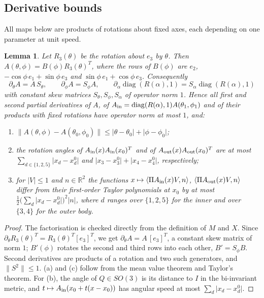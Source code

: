 \documentclass[11pt]{amsart}
\newtheorem{lemma}[theorem]{Lemma}
\theoremstyle{definition}
\newcommand{\R}{\mathbb{R}}
\newcommand{\Prj}{\Pi}
\newcommand{\ip}[2]{\langle #1,#2\rangle}
\newcommand{\abs}[1]{\lvert #1\rvert}
\newcommand{\norm}[1]{\lVert #1\rVert}
\begin{document}
\subsection{Derivative bounds}
All maps below are products of rotations about fixed axes, each depending on one parameter at unit speed.
\begin{lemma}\label{lem:deriv}
Let $R_3(\theta)$ be the rotation about $e_3$ by $\theta$. Then $A(\theta,\phi)=B(\phi)R_3(\theta)^T$, where the rows of
$B(\phi)$ are $e_2$, $-\cos\phi\,e_1+\sin\phi\,e_3$ and $\sin\phi\,e_1+\cos\phi\,e_3$. Consequently
\[
\partial_\theta A=A\,S_\theta,\qquad \partial_\phi A=S_\phi A,\qquad \partial_\alpha\operatorname{diag}(R(\alpha),1)=S_\alpha\operatorname{diag}(R(\alpha),1)
\]
with constant skew matrices $S_\theta,S_\phi,S_\alpha$ of operator norm $1$. Hence all first and second partial
derivatives of $A$, of $A_{\rm in}=\operatorname{diag}(R(\alpha),1)A(\theta_1,\phi_1)$ and of their products with fixed
rotations have operator norm at most $1$, and:
\begin{enumerate}[label=(\alph*)]
\item $\norm{A(\theta,\phi)-A(\theta_0,\phi_0)}\le\abs{\theta-\theta_0}+\abs{\phi-\phi_0}$;
\item the rotation angles of $A_{\rm in}(x)A_{\rm in}(x_0)^T$ and of $A_{\rm out}(x)A_{\rm out}(x_0)^T$ are at most
 $\sum_{d\in\{1,2,5\}}\abs{x_d-x_d^0}$ and $\abs{x_3-x_3^0}+\abs{x_4-x_4^0}$, respectively;
\item for $\abs V\le1$ and $n\in\R^2$ the functions $x\mapsto\ip{\Prj A_{\rm in}(x)V}{n}$, $\ip{\Prj A_{\rm out}(x)V}{n}$ differ
 from their first-order Taylor polynomials at $x_0$ by at most $\tfrac12\bigl(\sum_d\abs{x_d-x_d^0}\bigr)^2\abs n$, where
 $d$ ranges over $\{1,2,5\}$ for the inner and over $\{3,4\}$ for the outer body.
\end{enumerate}
\end{lemma}
\begin{proof}
The factorisation is checked directly from the definition of $M$ and $X$. Since
$\partial_\theta R_3(\theta)^T=R_3(\theta)^T[e_3]^T$, we get
$\partial_\theta A=A\,[e_3]^T$, a constant skew matrix of norm $1$; $B'(\phi)$ rotates the second and third rows
into each other, $B'=S_\phi B$. Second derivatives are products of a rotation and two such generators, and
$\norm{S^2}\le1$. (a) and (c) follow from the mean value theorem and Taylor's theorem. For (b), the angle of $Q\in SO(3)$
is its distance to $I$ in the bi-invariant metric, and $t\mapsto A_{\rm in}(x_0+t(x-x_0))$ has angular speed at most
$\sum_d\abs{x_d-x_d^0}$.
\end{proof}
\end{document}
